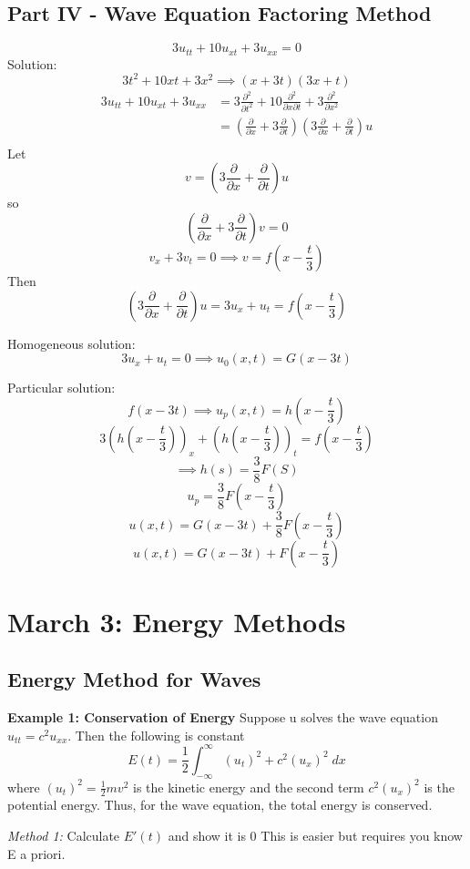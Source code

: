 \documentclass[12pt]{article}
\begin{document}
\subsection*{Part IV - Wave Equation Factoring Method}
\[3u_{tt} + 10u_{xt} + 3u_{xx} = 0\]
Solution:
\[3t^2 + 10xt + 3x^2 \implies \left(x + 3t\right)\left(3x+ t\right)\]
\begin{align*}
    3u_{tt} + 10u_{xt} + 3u_{xx} &= 3\frac{\partial^2}{\partial t^2}+ 10\frac{\partial^2}{\partial x\partial t} + 3\frac{\partial^2}{\partial x^2}\\
    &= \left(\frac{\partial}{\partial x}+ 3\frac{\partial}{\partial t}\right)\left(3\frac{\partial}{\partial x}+ \frac{\partial}{\partial t}\right)u\\
\end{align*}
Let 
\[v = \left(3\frac{\partial}{\partial x}+ \frac{\partial}{\partial t}\right)u\]
so 
\[\left(\frac{\partial}{\partial x}+ 3\frac{\partial}{\partial t}\right)v = 0\]
\[v_x + 3v_t = 0 \implies v = f(x - \frac{t}{3})\]
Then
\[\left(3\frac{\partial}{\partial x}+ \frac{\partial}{\partial t}\right)u = 3u_x + u_t  = f(x - \frac{t}{3})\]

Homogeneous solution:
\[3u_x + u_t = 0 \implies u_0(x, t) = G(x - 3t)\]

Particular solution:
\[f(x - 3t) \implies u_p(x, t) = h(x - \frac{t}{3})\]
\[3(h(x - \frac{t}{3}))_x + (h(x - \frac{t}{3}))_t = f(x - \frac{t}{3})\]
\[\implies h(s) = \frac{3}{8}F(S)\]
\[u_p = \frac{3}{8}F(x - \frac{t}{3})\]
\[u(x, t) = G(x - 3t) + \frac{3}{8}F(x - \frac{t}{3})\]
\[\boxed{u(x, t) = G(x - 3t) + F(x - \frac{t}{3})}\]

\section{March 3: Energy Methods}
\subsection*{Energy Method for Waves}
\textbf{Example 1: Conservation of Energy}
Suppose u solves the wave equation $u_{tt} = c^2 u_{xx}$. Then the following is constant 
\[E(t) = \frac{1}{2}\int_{-\infty}^\infty (u_t)^2 + c^2(u_x)^2\; dx\]
where $(u_t)^2 = \frac{1}{2}mv^2$ is the kinetic energy and the second term $c^2(u_x)^2$ is the potential energy. Thus, for the wave equation, the total energy is conserved. 

\emph{Method 1:} Calculate $E'(t)$ and show it is 0
This is easier but requires you know E a priori.
\end{document}

